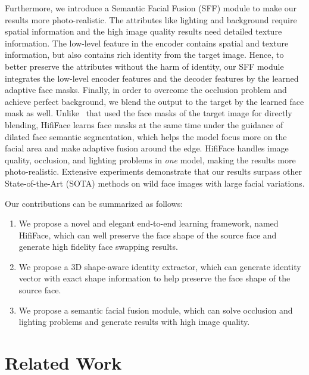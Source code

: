\documentclass{article}
\begin{document}
Furthermore, we introduce a Semantic Facial Fusion (SFF) module to make our results more photo-realistic. 
The attributes like lighting and background require spatial information and the high image quality results need detailed texture information. The low-level feature in the encoder contains spatial and texture information, but also contains rich identity from the target image. 
Hence, to better preserve the attributes without the harm of identity, our SFF module integrates the low-level encoder features and the decoder features by the learned adaptive face masks.
Finally, in order to overcome the occlusion problem and achieve perfect background, we blend the output to the target by the learned face mask as well.
Unlike~\cite{Nirkin2019fsgan} that used the face masks of the target image for directly blending, HifiFace learns face masks at the same time under the guidance of dilated face semantic segmentation, which helps the model focus more on the facial area and make adaptive fusion around the edge.  
HifiFace handles image quality, occlusion, and lighting problems in \textit{one} model, making the results more photo-realistic. Extensive experiments demonstrate that our results surpass other State-of-the-Art (SOTA) methods on wild face images with large facial variations. 

Our contributions can be summarized as follows:
\begin{enumerate}
    \item We propose a novel and elegant end-to-end learning framework, named HifiFace, which can well preserve the face shape of the source face and generate high fidelity face swapping results.
    \item We propose a 3D shape-aware identity extractor, which can generate identity vector with exact shape information to help preserve the face shape of the source face.
    \item We propose a semantic facial fusion module, which can solve occlusion and lighting problems and generate results with high image quality.

    

\end{enumerate}




\section{Related Work}
\end{document}
